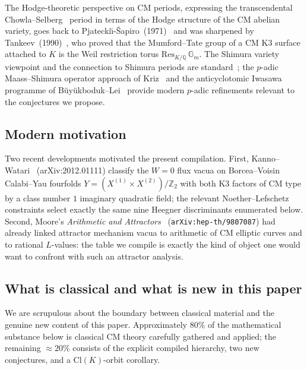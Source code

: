 \documentclass[12pt]{amsart}
\theoremstyle{definition}
\newcommand{\Q}{\mathbb{Q}}
\newcommand{\Z}{\mathbb{Z}}
\begin{document}
The Hodge-theoretic perspective on CM periods, expressing the
transcendental Chowla--Selberg~\cite{ChowlaSelberg1949} period in terms of
the Hodge structure of the CM abelian variety, goes back to
Pjatecki\u{\i}-\v{S}apiro~(1971)~\cite{CITE-NEEDED-PS1971} and was
sharpened by Tankeev~(1990)~\cite{CITE-NEEDED-Tankeev1990}, who proved that
the Mumford--Tate group of a CM K3 surface attached to $K$ is the Weil
restriction torus $\mathrm{Res}_{K/\Q}\,\mathbb{G}_m$.
The Shimura variety viewpoint and the connection to Shimura periods are
standard~\cite{CITE-NEEDED-Shimura1971,CITE-NEEDED-Schappacher1988}; the
$p$-adic Maass--Shimura operator approach of Kriz~\cite{Kriz2018} and the
anticyclotomic Iwasawa programme of B\"uy\"ukboduk--Lei~\cite{BuyukbodukLei2016}
provide modern $p$-adic refinements relevant to the conjectures we propose.

\subsection{Modern motivation}

Two recent developments motivated the present compilation.
First, Kanno--Watari~\cite{KannoWatari2020} (arXiv:2012.01111) classify the
$W=0$ flux vacua on Borcea--Voisin Calabi--Yau fourfolds
$Y = (X^{(1)} \times X^{(2)})/\Z_2$ with both $\mathrm{K3}$ factors of
CM type by a class number $1$ imaginary quadratic field; the relevant
Noether--Lefschetz constraints select exactly the same nine Heegner
discriminants enumerated below.
Second, Moore's \emph{Arithmetic and Attractors}~\cite{Moore1998}
(\texttt{arXiv:hep-th/9807087}) had already linked attractor
mechanism vacua to arithmetic of CM elliptic curves and to rational
$L$-values: the table we compile is exactly the kind of object one would
want to confront with such an attractor analysis.

\subsection{What is classical and what is new in this paper}

We are scrupulous about the boundary between classical material and the
genuine new content of this paper. Approximately $80\%$ of the
mathematical substance below is classical CM theory carefully gathered
and applied; the remaining $\approx 20\%$ consists of the explicit
compiled hierarchy, two new conjectures, and a Cl$(K)$-orbit
corollary.
\end{document}
